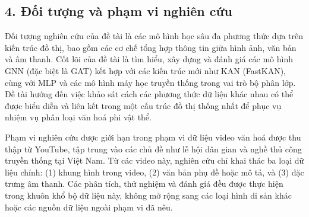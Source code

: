 \subsection{4. Đối tượng và phạm vi nghiên cứu}

\indent\indent Đối tượng nghiên cứu của đề tài là các mô hình học sâu đa phương thức dựa trên kiến trúc đồ thị, bao gồm các cơ chế tổng hợp thông tin giữa hình ảnh, văn bản và âm thanh. Cốt lõi của đề tài là tìm hiểu, xây dựng và đánh giá các mô hình GNN (đặc biệt là GAT) kết hợp với các kiến trúc mới như KAN (FastKAN), cùng với MLP và các mô hình máy học truyền thống trong vai trò bộ phân lớp. Đề tài hướng đến việc khảo sát cách các phương thức dữ liệu khác nhau có thể được biểu diễn và liên kết trong một cấu trúc đồ thị thống nhất để phục vụ nhiệm vụ phân loại văn hoá phi vật thể.\vspace{0.3cm}

Phạm vi nghiên cứu được giới hạn trong phạm vi dữ liệu video văn hoá được thu thập từ YouTube, tập trung vào các chủ đề như lễ hội dân gian và nghề thủ công truyền thống tại Việt Nam. Từ các video này, nghiên cứu chỉ khai thác ba loại dữ liệu chính: (1) khung hình trong video, (2) văn bản phụ đề hoặc mô tả, và (3) đặc trưng âm thanh. Các phân tích, thử nghiệm và đánh giá đều được thực hiện trong khuôn khổ bộ dữ liệu này, không mở rộng sang các loại hình di sản khác hoặc các nguồn dữ liệu ngoài phạm vi đã nêu.